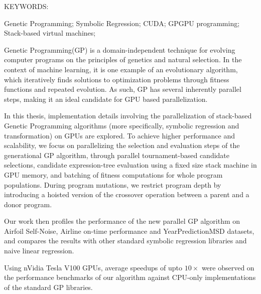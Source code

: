 \abstract

\noindent KEYWORDS: \hspace*{0.5em} 
\parbox[t]{4.4in}{  
  Genetic Programming;
	Symbolic Regression; 
  CUDA;
  GPGPU programming; 
  Stack-based virtual machines; 
}

\vspace*{24pt}

\noindent Genetic Programming(GP) is a domain-independent technique for evolving computer programs on the principles of genetics and natural selection. In the context of machine learning, it is one example of an evolutionary algorithm, which iteratively finds solutions to optimization problems through fitness functions and repeated evolution. As such, GP has several inherently parallel steps, making it an ideal candidate for GPU based parallelization. 

In this thesis, implementation details involving the parallelization of stack-based Genetic Programming algorithms (more specifically, symbolic regression and transformation) on GPUs are explored. To achieve higher performance and scalability, we focus on parallelizing the selection and evaluation steps of the generational GP algorithm, through parallel tournament-based candidate selections, candidate expression-tree evaluation using a fixed size stack machine in GPU memory, and batching of fitness computations for whole program populations. 
During program mutations, we restrict program depth by introducing a hoisted version of the crossover operation between a parent and a donor program. 

Our work then profiles the performance of the new parallel GP algorithm on Airfoil Self-Noise, Airline on-time performance and YearPredictionMSD datasets, and compares the results with other standard symbolic regression libraries and naive linear regression. 

Using nVidia Tesla V100 GPUs, average speedups of upto $10 \times$ were observed on the performance benchmarks of our algorithm against CPU-only implementations of the standard GP libraries.
\pagebreak